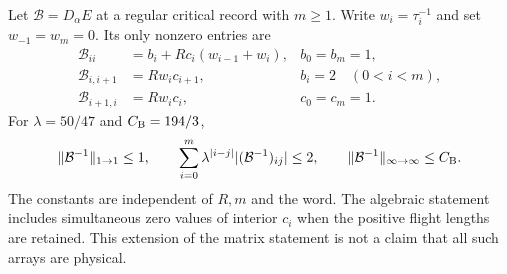 \begin{theorem}
\label{thm:cc-full-resolvent}
Let $\mathcal B=D_\alpha E$ at a regular critical record with $m\geq1$.
Write $w_i=\tau_i^{-1}$ and set $w_{-1}=w_m=0$.  Its only nonzero
entries are
\begin{equation}\label{eq:cc-matrix}
 \begin{aligned}
 \mathcal B_{ii}&=b_i+Rc_i(w_{i-1}+w_i),
     &b_0=b_m=1,\\[-2pt]
 \mathcal B_{i,i+1}&=Rw_i c_{i+1},
     &b_i=2\quad(0<i<m),\\
 \mathcal B_{i+1,i}&=Rw_i c_i,
     &c_0=c_m=1.
 \end{aligned}
\end{equation}
For $\lambda=50/47$ and $C_{\rm B}=194/3$,
\begin{equation}\label{eq:cc-inverse}
 \|\mathcal B^{-1}\|_{1\to1}\leq1,\qquad
 \sum_{i=0}^m\lambda^{|i-j|}|(\mathcal B^{-1})_{ij}|\leq2,
 \qquad \|\mathcal B^{-1}\|_{\infty\to\infty}\leq C_{\rm B}.
\end{equation}
The constants are independent of $R,m$ and the word.  The algebraic
statement includes simultaneous zero values of interior $c_i$ when
the positive flight lengths are retained.  This extension of the
matrix statement is not a claim that all such arrays are physical.
\end{theorem}
